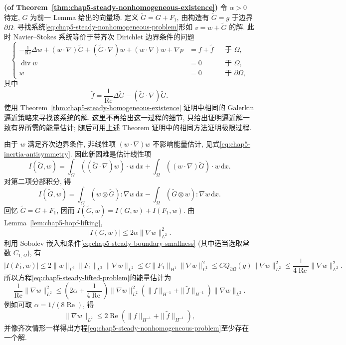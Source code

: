 \begin{Proof}
\textbf{(of Theorem~\ref{thm:chap5-steady-nonhomogeneous-existence})}\quad
令 $\alpha>0$ 待定, $G$ 为前一 Lemma 给出的向量场. 定义 $\widetilde G=G+F_1$, 由构造有 $\widetilde G=g$ 于边界 $\partial\Omega$. 寻找系统\eqref{eq:chap5-steady-nonhomogeneous-problem}形如 $v=w+\widetilde G$ 的解. 此时 Navier--Stokes 系统等价于带齐次 Dirichlet 边界条件的问题
\begin{equation}
\left\{
\begin{aligned}
 -\frac1{\operatorname{Re}}\Delta w
 +(w\cdot\nabla)\widetilde G+(\widetilde G\cdot\nabla)w
 +(w\cdot\nabla)w+\nabla p
 &=f+\widetilde f&&\text{于 }\Omega,\\
 \operatorname{div}w&=0&&\text{于 }\Omega,\\
 w&=0&&\text{于 }\partial\Omega,
\end{aligned}
\right.
\label{eq:chap5-steady-lifted-problem}
\end{equation}
其中
\begin{equation}
 \widetilde f=\frac1{\operatorname{Re}}\Delta\widetilde G
 -(\widetilde G\cdot\nabla)\widetilde G.
\label{eq:chap5-steady-lifted-source}
\end{equation}
使用 Theorem~\ref{thm:chap5-steady-homogeneous-existence} 证明中相同的 Galerkin 逼近策略来寻找该系统的解. 这里不再给出这一过程的细节, 只给出证明逼近解一致有界所需的能量估计; 随后可用上述 Theorem 证明中的相同方法证明极限过程.

由于 $w$ 满足齐次边界条件, 非线性项 $(w\cdot\nabla)w$ 不影响能量估计, 见式\eqref{eq:chap5-inertia-antisymmetry}. 因此新困难是估计线性项
\[
 I(\widetilde G,w)
 =\int_\Omega((\widetilde G\cdot\nabla)w)\cdot w\,\mathrm dx
 +\int_\Omega((w\cdot\nabla)\widetilde G)\cdot w\,\mathrm dx.
\]
对第二项分部积分, 得
\[
 I(\widetilde G,w)
 =\int_\Omega(w\otimes\widetilde G):\nabla w\,\mathrm dx
 -\int_\Omega(\widetilde G\otimes w):\nabla w\,\mathrm dx.
\]
回忆 $\widetilde G=G+F_1$, 因而 $I(\widetilde G,w)=I(G,w)+I(F_1,w)$. 由 Lemma~\ref{lem:chap5-hopf-lifting},
\[
 |I(G,w)|\leq2\alpha\|\nabla w\|_{L^2}^2.
\]
利用 Sobolev 嵌入和条件\eqref{eq:chap5-steady-boundary-smallness} (其中适当选取常数 $C_{1,\Omega}$), 有
\[
 |I(F_1,w)|
 \leq2\|w\|_{L^6}\|F_1\|_{L^3}\|\nabla w\|_{L^2}
 \leq C\|F_1\|_{H^1}\|\nabla w\|_{L^2}^2
 \leq C Q_{\partial\Omega}(g)\|\nabla w\|_{L^2}^2
 \leq\frac1{4\operatorname{Re}}\|\nabla w\|_{L^2}^2.
\]
所以方程\eqref{eq:chap5-steady-lifted-problem}的能量估计为
\[
 \frac1{\operatorname{Re}}\|\nabla w\|_{L^2}^2
 \leq\left(2\alpha+\frac1{4\operatorname{Re}}\right)\|\nabla w\|_{L^2}^2
\left(\|f\|_{H^{-1}}+\|\widetilde f\|_{H^{-1}}\right)\|\nabla w\|_{L^2}.
\]
例如可取 $\alpha=1/(8\operatorname{Re})$, 得
\begin{equation}
 \|\nabla w\|_{L^2}
 \leq2\operatorname{Re}
 \left(\|f\|_{H^{-1}}+\|\widetilde f\|_{H^{-1}}\right),
\label{eq:chap5-steady-lifted-energy-estimate}
\end{equation}
并像齐次情形一样得出方程\eqref{eq:chap5-steady-nonhomogeneous-problem}至少存在一个解.


\end{Proof}
